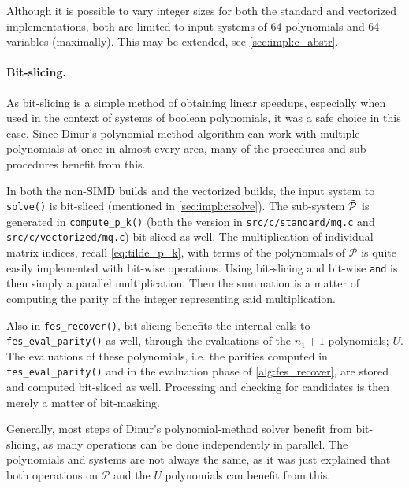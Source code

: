 Although it is possible to vary integer sizes for both the standard and vectorized implementations, both are limited to input systems of 64 polynomials and 64 variables (maximally). This may be extended, see \cref{sec:impl:c_abstr}.

\paragraph{Bit-slicing.} As bit-slicing is a simple method of obtaining linear speedups, especially when used in the context of systems of boolean polynomials, it was a safe choice in this case. Since Dinur's polynomial-method algorithm can work with multiple polynomials at once in almost every area, many of the procedures and sub-procedures benefit from this.

In both the non-SIMD builds and the vectorized builds, the input system to \texttt{solve()} is bit-sliced (mentioned in \cref{sec:impl:c:solve}). The sub-system $\Tilde{\mathcal{P}}$ is generated in \texttt{compute\_p\_k()} (both the version in \texttt{src/c/standard/mq.c} and \texttt{src/c/vectorized/mq.c}) bit-sliced as well. The multiplication of individual matrix indices, recall \cref{eq:tilde_p_k}, with terms of the polynomials of $\mathcal{P}$ is quite easily implemented with bit-wise operations. Using bit-slicing and bit-wise \texttt{and} is then simply a parallel multiplication. Then the summation is a matter of computing the parity of the integer representing said multiplication. 

Also in \texttt{fes\_recover()}, bit-slicing benefits the internal calls to \texttt{fes\_eval\_parity()} as well, through the evaluations of the $n_1 + 1$ polynomials; $U$. The evaluations of these polynomials, i.e. the parities computed in \texttt{fes\_eval\_parity()} and in the evaluation phase of \cref{alg:fes_recover}, are stored and computed bit-sliced as well. Processing and checking for candidates is then merely a matter of bit-masking. 

Generally, most steps of Dinur's polynomial-method solver benefit from bit-slicing, as many operations can be done independently in parallel. The polynomials and systems are not always the same, as it was just explained that both operations on $\mathcal{P}$ and the $U$ polynomials can benefit from this.

